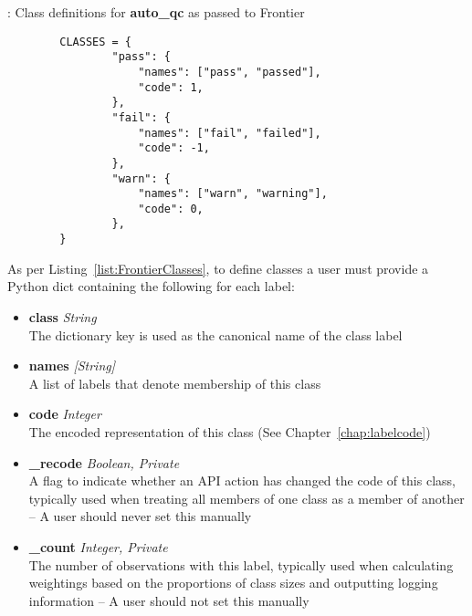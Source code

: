 \begin{listing}[H]
    \caption[FrontierClasses]{: Class definitions for \textbf{auto\_qc} as passed to Frontier}
    \label{list:FrontierClasses}
    \begin{verbatim}
        CLASSES = {
                "pass": {
                    "names": ["pass", "passed"],
                    "code": 1,
                },
                "fail": {
                    "names": ["fail", "failed"],
                    "code": -1,
                },
                "warn": {
                    "names": ["warn", "warning"],
                    "code": 0,
                },
        }
    \end{verbatim}
\end{listing}

As per Listing~\ref{list:FrontierClasses}, to define classes a user must provide
a Python dict containing the following for each label:

\begin{itemize}
    \item \textbf{class} \textit{String}\hfill\\
        The dictionary key is used as the canonical name of the class label
    \item \textbf{names} \textit{[String]}\hfill\\
        A list of labels that denote membership of this class
    \item \textbf{code} \textit{Integer}\hfill\\
        The encoded representation of this class (See Chapter~\ref{chap:labelcode})
    \item \textbf{\_recode} \textit{Boolean, Private}\hfill\\
        A flag to indicate whether an API action has changed the code of this
        class, typically used when treating all members of one class as a member
        of another -- A user should never set this manually
    \item \textbf{\_count} \textit{Integer, Private}\hfill\\
        The number of observations with this label, typically used when
        calculating weightings based on the proportions of class sizes and
        outputting logging information -- A user should not set this manually
\end{itemize}

